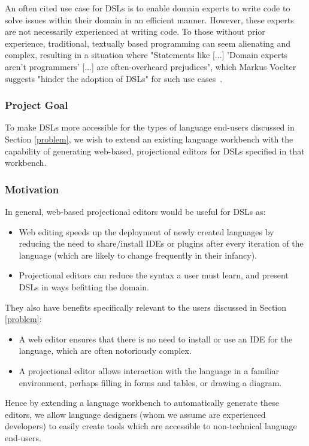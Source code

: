\documentclass{article}
\begin{document}
An often cited use case for DSLs is to enable domain experts to write code to solve issues within their domain in an efficient manner. However, these experts are not necessarily experienced at writing code. To those without prior experience, traditional, textually based programming can seem alienating and complex, resulting in a situation where "Statements like [...] 'Domain experts aren't programmers' [...] are often-overheard prejudices", which Markus Voelter suggests "hinder the adoption of DSLs" for such use cases~\cite[pg.45]{dslEngineering}.

\subsubsection{Project Goal}\label{goal}
To make DSLs more accessible for the types of language end-users discussed in Section \ref{problem}, we wish to extend an existing language workbench with the capability of generating web-based, projectional editors for DSLs specified in that workbench. 

\subsubsection{Motivation}\label{motivation}
In general, web-based projectional editors would be useful for DSLs as:
\begin{itemize}
\item Web editing speeds up the deployment of newly created languages by reducing the need to share/install IDEs or plugins after every iteration of the language (which are likely to change frequently in their infancy). 
\item Projectional editors can reduce the syntax a user must learn, and present DSLs in ways befitting the domain.
\end{itemize} 
They also have benefits specifically relevant to the users discussed in Section \ref{problem}:
\begin{itemize}
\item A web editor ensures that there is no need to install or use an IDE for the language, which are often notoriously complex. 
\item A projectional editor allows interaction with the language in a familiar environment, perhaps filling in forms and tables, or drawing a diagram.
\end{itemize}
Hence by extending a language workbench to automatically generate these editors, we allow language designers (whom we assume are experienced developers) to easily create tools which are accessible to non-technical language end-users.
\end{document}
